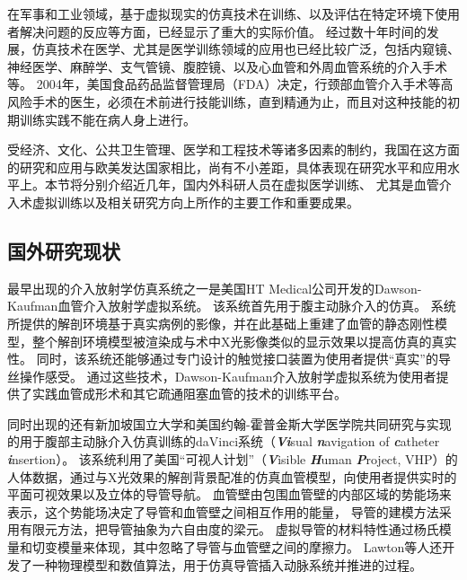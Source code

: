 在军事和工业领域，基于虚拟现实的仿真技术在训练、以及评估在特定环境下使用者解决问题的反应等方面，已经显示了重大的实际价值\cite{Goodwin1978Simulator}\cite{Rolfe1986Simulators}\cite{Ressler1999Simulators}\cite{Wachtel1985Simulators}\cite{Liu2013Military}。
经过数十年时间的发展\cite{Dawson1998}，仿真技术在医学、尤其是医学训练领域的应用也已经比较广泛，包括内窥镜\cite{Vining1995Endoscopy}\cite{Preminger1996Endoscopy}、神经医学\cite{Kockro2000Neurosurgery}\cite{Cotin2005EVE}\cite{Ma2007NeuroCath}、麻醉学\cite{Gaba1988Anesthesiology}、支气管镜\cite{Vining1996Bronchoscopy}、腹腔镜\cite{Hon1994Laparoscopy}\cite{Derossis1998Laparoscopy}、以及心血管和外周血管系统的介入手术\cite{Chui1998ICard}\cite{Cotin2000ICTS}\cite{Tan2012NUDT}等。
2004年，美国食品药品监督管理局（FDA）决定，行颈部血管介入手术等高风险手术的医生，必须在术前进行技能训练，直到精通为止，而且对这种技能的初期训练实践不能在病人身上进行\cite{Dawson2006Medicine}。

受经济、文化、公共卫生管理、医学和工程技术等诸多因素的制约，我国在这方面的研究和应用与欧美发达国家相比，尚有不小差距，具体表现在研究水平和应用水平上。本节将分别介绍近几年，国内外科研人员在虚拟医学训练、
尤其是血管介入术虚拟训练以及相关研究方向上所作的主要工作和重要成果。

\subsection{国外研究现状}
\label{sec1-3-1}

最早出现的介入放射学仿真系统之一是美国HT Medical公司开发的Dawson-Kaufman血管介入放射学虚拟系统\cite{Higgins1995DK}\cite{Dawson1996DK}\cite{meglan1996DK}。
该系统首先用于腹主动脉介入的仿真\cite{Wang1998ICard}。
系统所提供的解剖环境基于真实病例的影像，并在此基础上重建了血管的静态刚性模型，整个解剖环境模型被渲染成与术中X光影像类似的显示效果以提高仿真的真实性\cite{Higgins1995DK}。
同时，该系统还能够通过专门设计的触觉接口装置为使用者提供“真实”的导丝操作感受\cite{BroNielsen1997DK}。
通过这些技术，Dawson-Kaufman介入放射学虚拟系统为使用者提供了实践血管成形术和其它疏通阻塞血管的技术的训练平台。

同时出现的还有新加坡国立大学和美国约翰-霍普金斯大学医学院共同研究与实现的用于腹部主动脉介入仿真训练的daVinci系统（\textbf{\textit{Vi}}sual \textbf{\textit{n}}avigation of \textbf{\textit{c}}atheter \textbf{\textit{i}}nsertion\cite{Lawton2000daVinci}）\cite{Anderson1996daVinci}\cite{Anderson1996adaVinci}\cite{Anderson1997daVinci}\cite{Anderson1997adaVinci}。
该系统利用了美国“可视人计划”（\textbf{\textit{V}}isible \textbf{\textit{H}}uman \textbf{\textit{P}}roject, VHP）\cite{vhpweb}的人体数据，通过与X光效果的解剖背景配准的仿真血管模型，向使用者提供实时的平面可视效果以及立体的导管导航\cite{Anderson1998daVinci}。
血管壁由包围血管壁的内部区域的势能场来表示，这个势能场决定了导管和血管壁之间相互作用的能量，
导管的建模方法采用有限元方法，把导管抽象为六自由度的梁元\cite{Chui1996daVinci}\cite{Wang1996daVinci}。
虚拟导管的材料特性通过杨氏模量和切变模量来体现，其中忽略了导管与血管壁之间的摩擦力\cite{Anderson1998daVinci}。
Lawton等人\cite{Lawton2000daVinci}还开发了一种物理模型和数值算法，用于仿真导管插入动脉系统并推进的过程。

